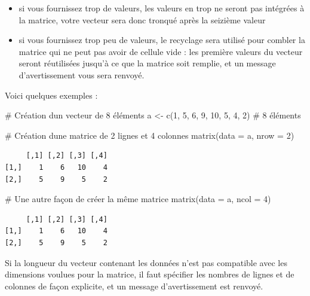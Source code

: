 \documentclass[
  french,
  a4paper,
  DIV=11,
  numbers=noendperiod,
  oneside]{scrreprt}
\newenvironment{Shaded}{}{}
\newcommand{\AttributeTok}[1]{\textcolor[rgb]{0.84,0.23,0.29}{#1}}
\newcommand{\CommentTok}[1]{\textcolor[rgb]{0.42,0.45,0.49}{#1}}
\newcommand{\DecValTok}[1]{\textcolor[rgb]{0.00,0.36,0.77}{#1}}
\newcommand{\FunctionTok}[1]{\textcolor[rgb]{0.44,0.26,0.76}{#1}}
\newcommand{\NormalTok}[1]{\textcolor[rgb]{0.14,0.16,0.18}{#1}}
\newcommand{\OtherTok}[1]{\textcolor[rgb]{0.44,0.26,0.76}{#1}}
\providecommand{\tightlist}{%
  \setlength{\itemsep}{0pt}\setlength{\parskip}{0pt}}
\begin{document}
\begin{tcolorbox}
\begin{itemize}
\tightlist
\item
  si vous fournissez trop de valeurs, les valeurs en trop ne seront pas
  intégrées à la matrice, votre vecteur sera donc tronqué après la
  seizième valeur
\item
  si vous fournissez trop peu de valeurs, le recyclage sera utilisé pour
  combler la matrice qui ne peut pas avoir de cellule vide : les
  première valeurs du vecteur seront réutilisées jusqu'à ce que la
  matrice soit remplie, et un message d'avertissement vous sera renvoyé.
\end{itemize}

Voici quelques exemples :

\begin{Shaded}
\begin{Highlighting}[]
\CommentTok{\# Création d\textquotesingle{}un vecteur de 8 éléments}
\NormalTok{a }\OtherTok{\textless{}{-}} \FunctionTok{c}\NormalTok{(}\DecValTok{1}\NormalTok{, }\DecValTok{5}\NormalTok{, }\DecValTok{6}\NormalTok{, }\DecValTok{9}\NormalTok{, }\DecValTok{10}\NormalTok{, }\DecValTok{5}\NormalTok{, }\DecValTok{4}\NormalTok{, }\DecValTok{2}\NormalTok{)  }\CommentTok{\# 8 éléments}

\CommentTok{\# Création d\textquotesingle{}une matrice de 2 lignes et 4 colonnes}
\FunctionTok{matrix}\NormalTok{(}\AttributeTok{data =}\NormalTok{ a, }\AttributeTok{nrow =} \DecValTok{2}\NormalTok{)}
\end{Highlighting}
\end{Shaded}

\begin{verbatim}
     [,1] [,2] [,3] [,4]
[1,]    1    6   10    4
[2,]    5    9    5    2
\end{verbatim}

\begin{Shaded}
\begin{Highlighting}[]
\CommentTok{\# Une autre façon de créer la même matrice}
\FunctionTok{matrix}\NormalTok{(}\AttributeTok{data =}\NormalTok{ a, }\AttributeTok{ncol =} \DecValTok{4}\NormalTok{)}
\end{Highlighting}
\end{Shaded}

\begin{verbatim}
     [,1] [,2] [,3] [,4]
[1,]    1    6   10    4
[2,]    5    9    5    2
\end{verbatim}

Si la longueur du vecteur contenant les données n'est pas compatible
avec les dimensions voulues pour la matrice, il faut spécifier les
nombres de lignes et de colonnes de façon explicite, et un message
d'avertissement est renvoyé.


\end{tcolorbox}
\end{document}
